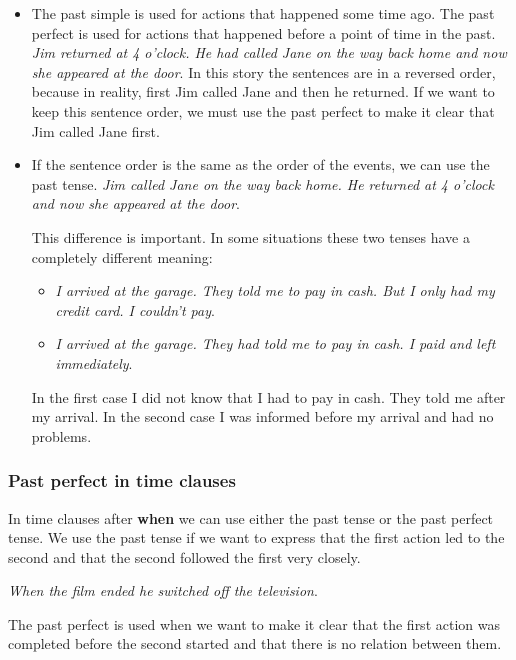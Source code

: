\begin{itemize}

\item The past simple is used for actions that happened some time ago. The past perfect is used for actions that happened before a point of time in the past. \textit{Jim returned at 4 o'clock. He had called Jane on the way back home and now she appeared at the door}. In this story the sentences are in a reversed order, because in reality, first Jim called Jane and then he returned. If we want to keep this sentence order, we must use the past perfect to make it clear that Jim called Jane first. 

\item If the sentence order is the same as the order of the events, we can use the past tense. \textit{Jim called Jane on the way back home. He returned at 4 o'clock and now she appeared at the door}.

This difference is important. In some situations these two tenses have a completely different meaning:

\begin{itemize}

\item \textit{I arrived at the garage. They told me to pay in cash. But I only had my credit card. I couldn't pay}.
\item \textit{I arrived at the garage. They had told me to pay in cash. I paid and left immediately}.
\end{itemize}

In the first case I did not know that I had to pay in cash. They told me after my arrival. In the second case I was informed before my arrival and had no problems.

\end{itemize}

\subsubsection{Past perfect in time clauses}

In time clauses after \textbf{when} we can use either the past tense or the past perfect tense. We use the past tense if we want to express that the first action led to the second and that the second followed the first very closely. 

\textit{When the film ended he switched off the television}.

The past perfect is used when we want to make it clear that the first action was completed before the second started and that there is no relation between them.

